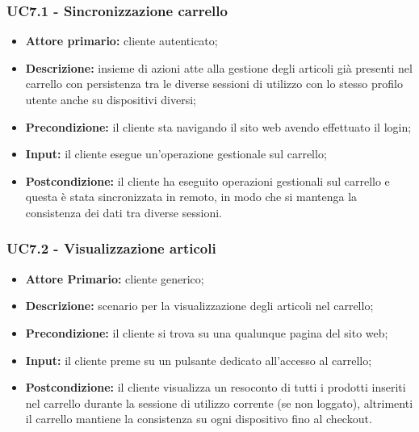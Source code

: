 \subsubsection{UC7.1 - Sincronizzazione carrello}
\label{UC7.1}
\begin{itemize}
    \item \textbf{Attore primario:} cliente autenticato;
    \item \textbf{Descrizione:} insieme di azioni atte alla gestione degli articoli già presenti nel carrello con
                                persistenza tra le diverse sessioni di utilizzo con lo stesso profilo utente anche su dispositivi diversi;
    \item \textbf{Precondizione:} il cliente sta navigando il sito web avendo effettuato il login;
    \item \textbf{Input:} il cliente esegue un'operazione gestionale sul carrello;
    \item \textbf{Postcondizione:} il cliente ha eseguito operazioni gestionali sul carrello e questa è stata sincronizzata in remoto,
                                   in modo che si mantenga la consistenza dei dati tra diverse sessioni.
\end{itemize}

\subsubsection{UC7.2 - Visualizzazione articoli}
\label{UC7.2}
\begin{itemize}
    \item \textbf{Attore Primario:} cliente generico;
    \item \textbf{Descrizione:} scenario per la visualizzazione degli articoli nel carrello;
    \item \textbf{Precondizione:} il cliente si trova su una qualunque pagina del sito web;
    \item \textbf{Input:} il cliente preme su un pulsante dedicato all'accesso al carrello;
    \item \textbf{Postcondizione:} il cliente visualizza un resoconto di tutti i prodotti inseriti nel carrello durante
                                   la sessione di utilizzo corrente (se non loggato), altrimenti il carrello mantiene la consistenza
                                   su ogni dispositivo fino al checkout.
\end{itemize}

